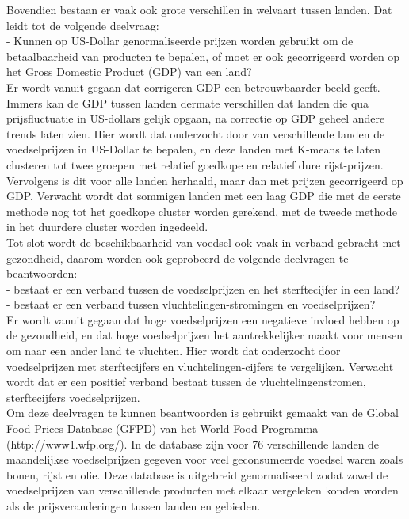 \documentclass{article}
\begin{document}
Bovendien bestaan er vaak ook grote verschillen in welvaart tussen landen. Dat leidt tot de volgende deelvraag:\\
- Kunnen op US-Dollar genormaliseerde prijzen worden gebruikt om de betaalbaarheid van producten te bepalen, of moet er ook gecorrigeerd worden op het Gross Domestic Product (GDP) van een land? \\
Er wordt vanuit gegaan dat corrigeren GDP een betrouwbaarder beeld geeft. Immers kan de GDP tussen landen dermate verschillen dat landen die qua prijsfluctuatie in US-dollars gelijk opgaan, na correctie op GDP geheel andere trends laten zien.
Hier wordt dat onderzocht door van verschillende landen de voedselprijzen in US-Dollar te bepalen, en deze landen met K-means te laten clusteren tot twee groepen met relatief goedkope en relatief dure rijst-prijzen. Vervolgens is dit voor alle landen herhaald, maar dan met prijzen gecorrigeerd op GDP.
Verwacht wordt dat sommigen landen met een laag GDP die met de eerste methode nog tot het goedkope cluster worden gerekend, met de tweede methode in het duurdere cluster worden ingedeeld.\\

Tot slot wordt de beschikbaarheid van voedsel ook vaak in verband gebracht met gezondheid, daarom worden ook geprobeerd de volgende deelvragen te beantwoorden:\\
- bestaat er een verband tussen de voedselprijzen en het sterftecijfer in een land?\\
- bestaat er een verband tussen vluchtelingen-stromingen en voedselprijzen? \\
Er wordt vanuit gegaan dat hoge voedselprijzen een negatieve invloed hebben op de gezondheid, en dat hoge voedselprijzen het aantrekkelijker maakt voor mensen om naar een ander land te vluchten.
Hier wordt dat onderzocht door voedselprijzen met sterftecijfers en vluchtelingen-cijfers te vergelijken.
Verwacht wordt dat er een positief verband bestaat tussen de vluchtelingenstromen, sterftecijfers voedselprijzen. \\

Om deze deelvragen te kunnen beantwoorden is gebruikt gemaakt van de Global Food Prices Database (GFPD) van het World Food Programma (http://www1.wfp.org/). In de database zijn voor 76 verschillende landen de maandelijkse voedselprijzen gegeven voor veel geconsumeerde voedsel waren zoals bonen, rijst en olie. Deze database is uitgebreid genormaliseerd zodat zowel de voedselprijzen van verschillende producten met elkaar vergeleken konden worden als de prijsveranderingen tussen landen en gebieden. \\
\end{document}
